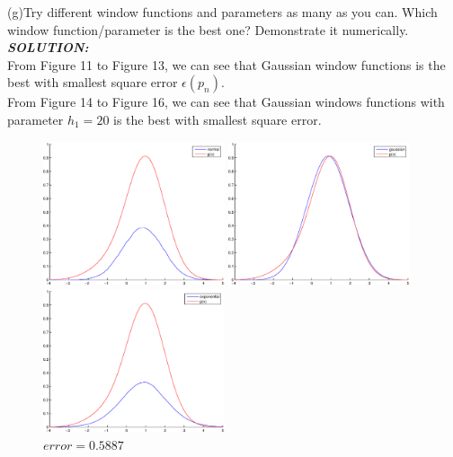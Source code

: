 \documentclass{article}
\theoremstyle{definition}
\theoremstyle{definition}
\theoremstyle{remark}
\begin{document}
(g)Try different window functions and parameters as many as you can. Which window
function/parameter is the best one? Demonstrate it numerically.\\
\emph{\textbf{SOLUTION:}}\\
From Figure 11 to Figure 13, we can see that Gaussian window functions is the best with smallest square error $\epsilon(p_n)$.\\
From Figure 14 to Figure 16, we can see that Gaussian windows functions with parameter $h_1=20$ is the best with smallest square error.
\begin{figure}[!htbp]
\begin{minipage}[t]{0.3\linewidth}
\centering
\includegraphics[width=2.1in]{normal.eps}
\caption{$error=0.5367$}
\end{minipage}%
\begin{minipage}[t]{0.3\linewidth}
\centering
\includegraphics[width=2.1in]{gaussian.eps}
\caption{$error=0.0073$}
\end{minipage}
\begin{minipage}[t]{0.3\linewidth}
\centering
\includegraphics[width=2.1in]{exponential.eps}
\caption{$error=0.5887$}
\end{minipage}
\end{figure}
\end{document}

